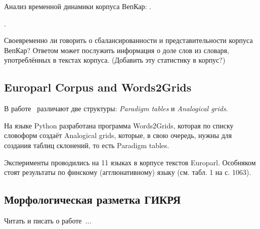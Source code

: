 \bigskip

Анализ временной динамики корпуса ВепКар: 
.

.

\bigskip

Своевременно ли говорить о сбалансированности и представительности корпуса ВепКар? 
Ответом может послужить информация о доле слов из словаря, употреблённых в текстах корпуса. 
(Добавить эту статистику в корпус?)



\subsection{Europarl Corpus and Words2Grids}

В работе~\cite{Fam2018tools} различают две структуры: \emph{Paradigm tables} 
и \emph{Analogical grids}. 

На языке Python разработана программа Words2Grids, которая по списку словоформ 
создаёт Analogical grids, которые, в свою очередь, нужны для создания 
таблиц склонений, то есть Paradigm tables.

Эксперименты проводились на 11 языках в корпусе текстов Europarl. 
Особняком стоят результаты по финскому (агглюнативному) языку (см. табл. 1 на с. 1063).


\subsection{Морфологическая разметка ГИКРЯ}

Читать и писать о работе~\cite{Selegey2016}...
